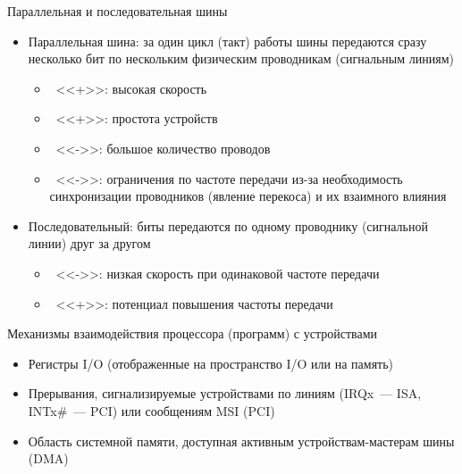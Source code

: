 \documentclass[aspectratio=169,14pt]{beamer}
\begin{document}
\begin{frame}{Параллельная и последовательная шины}
    \begin{itemize}
        \item Параллельная шина: за один цикл (такт) работы шины передаются
        сразу несколько бит по нескольким физическим проводникам
        (сигнальным линиям)
        \begin{itemize}
            \item ~<<+>>: высокая скорость
            \item ~<<+>>: простота устройств
            \item ~<<->>: большое количество проводов
            \item ~<<->>: ограничения по частоте передачи из-за необходимость
            синхронизации проводников (явление перекоса) и их взаимного
            влияния
        \end{itemize}
        \item Последовательный: биты передаются по одному проводнику
        (сигнальной линии) друг за другом
        \begin{itemize}
            \item ~<<->>: низкая скорость при одинаковой частоте передачи
            \item ~<<+>>: потенциал повышения частоты передачи
        \end{itemize}
    \end{itemize}
\end{frame}

\begin{frame}{Механизмы взаимодействия процессора (программ) с устройствами}
    \begin{itemize}
        \item Регистры I/O (отображенные на пространство I/O или
        на память)
        \item Прерывания, сигнализируемые устройствами по линиям
        (IRQx~--- ISA, INTx\#~--- PCI) или сообщениям MSI (PCI)
        \item Область системной памяти, доступная активным
        устройствам-мастерам шины (DMA)
    \end{itemize}
\end{frame}
\end{document}
